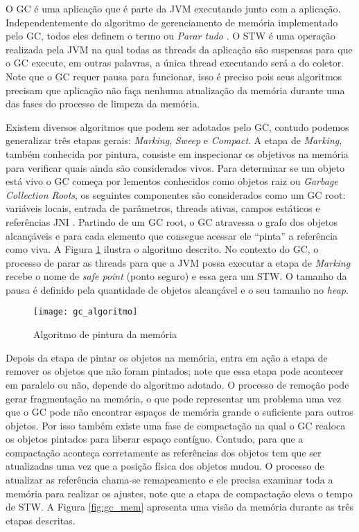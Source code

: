 O GC é uma aplicação que é parte da JVM executando junto com a aplicação.
Independentemente do algoritmo de gerenciamento de memória implementado pelo
GC, todos eles definem o termo  ou
\textit{Parar tudo} \citep{gc_pauseless}. O STW é uma operação realizada pela
JVM  na qual todas as threads da aplicação são suspensas para que o GC execute,
em outras palavras, a única thread executando será a do coletor. Note que o GC
requer pausa para funcionar, isso é preciso pois seus algoritmos precisam que
aplicação não faça nenhuma atualização da memória durante uma das fases do
processo de limpeza da memória.

Existem diversos algoritmos que podem ser adotados pelo GC, contudo podemos
generalizar três etapas gerais: \textit{Marking}, \textit{Sweep} e
\textit{Compact}. A etapa de \textit{Marking}, também conhecida por pintura,
consiste em inspecionar os objetivos na memória para verificar quais ainda são
considerados vivos. Para determinar se um objeto está vivo o GC começa por
lementos conhecidos como objetos raiz ou \textit{Garbage Collection Roots}, os
seguintes componentes são considerados como um GC root: variáveis locais,
entrada de parâmetros, threads ativas, campos estáticos e referências JNI
\citep{gc_basics}. Partindo de um GC root, o GC atravessa o grafo dos objetos
alcançáveis e para cada elemento que consegue acessar ele “pinta” a referência
como viva. A Figura \ref{fig:gc_alg} ilustra o algoritmo descrito. No contexto
do GC, o processo de parar as threads para que a JVM possa executar a etapa de
\textit{Marking} recebe o nome de \textit{safe point} (ponto seguro) e essa
gera um STW. O tamanho da pausa é definido pela quantidade de objetos
alcançável e o seu tamanho no \textit{heap}.

\begin{figure}[!h]
  \centering
  \texttt{[image: gc\_algoritmo]}
	\caption[Algoritmo de pintura da memória]{Algoritmo de pintura da memória\citep{gc_basics}}
  \label{fig:gc_alg}
\end{figure}

Depois da etapa de pintar os objetos na memória, entra em ação a etapa de
remover os objetos que não foram pintados; note que essa etapa pode acontecer
em paralelo ou não, depende do algoritmo adotado. O processo de remoção pode
gerar fragmentação na memória, o que pode representar um problema uma vez que o
GC pode não encontrar espaços de memória grande o suficiente para outros
objetos. Por isso também existe uma fase de compactação na qual o GC realoca os
objetos pintados para liberar espaço contíguo. Contudo, para que a compactação
aconteça corretamente as referências dos objetos tem que ser atualizadas uma
vez que a posição física dos objetos mudou. O processo de atualizar as
referência chama-se remapeamento e ele precisa examinar toda a memória para
realizar os ajustes, note que a etapa de compactação eleva o tempo de STW. A
Figura \ref{fig:gc_mem} apresenta uma visão da memória durante as três etapas
descritas.


